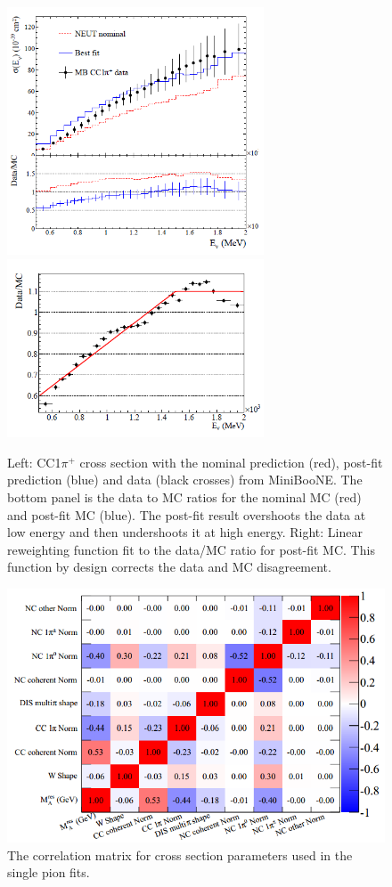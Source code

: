 \begin{figure}
\centering
\includegraphics[width=3in]{Figures/1pienushp1.PNG}
\includegraphics[width=3in]{Figures/1pienushp2.PNG}
\caption{Left: CC1$\pi^+$ cross section with the nominal prediction (red), post-fit prediction (blue) and data (black crosses) from MiniBooNE. The bottom panel is the data to MC ratios for the nominal MC (red) and post-fit MC (blue). The post-fit result overshoots the data at low energy and then undershoots it at high energy. Right: Linear reweighting function fit to the data/MC ratio for post-fit MC. This function by design corrects the data and MC disagreement.}
\label{fig:cc1pishp}
\end{figure}

\begin{figure}
\centering
\includegraphics[width=6in]{Figures/xseccorr.png}
\caption{The correlation matrix for cross section parameters used in the single pion fits\cite{xsectn}.}
\label{fig:xseccorr}
\end{figure}

